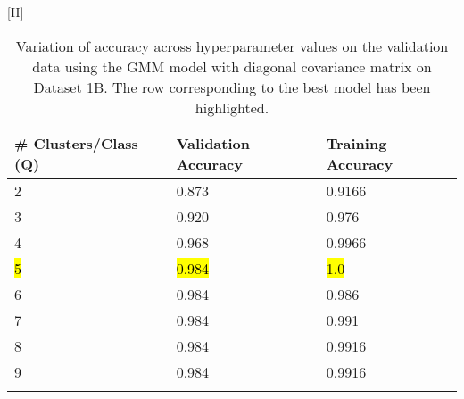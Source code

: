 \begin{center}[H]
\begin{longtable}{l l l}
\hline
\hline
\textbf{\# Clusters/Class (Q)} &  \textbf{Validation Accuracy} &  \textbf{Training Accuracy}  \\
\hline
\hline
2 & 0.873 & 0.9166\\
3 & 0.920 & 0.976\\
4 & 0.968 & 0.9966\\
\hl{5} & \hl{0.984} & \hl{1.0}\\
6 & 0.984 & 0.986\\
7 & 0.984 & 0.991\\
8 & 0.984 & 0.9916\\
9 & 0.984 & 0.9916\\
\hline
\caption{Variation of accuracy across hyperparameter values on the validation data using the GMM model with diagonal covariance matrix on Dataset 1B. The row corresponding to the best model has been highlighted.}
\end{longtable}
\label{tab:cv1b}
\end{center}

